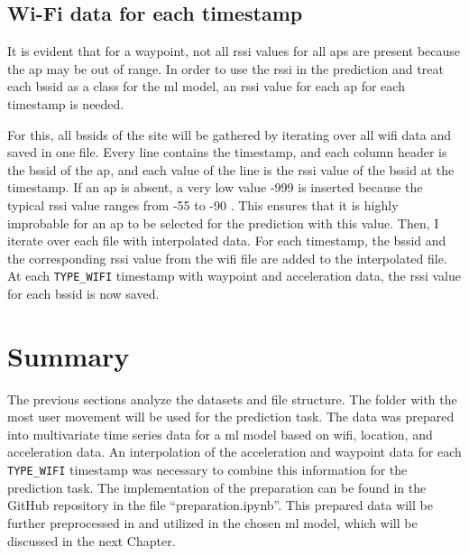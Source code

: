 \subsection{Wi-Fi data for each timestamp}\label{sec:wifi-data}
It is evident that for a waypoint, not all \ac{rssi} values for all \acp{ap} are present because the \ac{ap} may be out of range.
In order to use the \ac{rssi} in the prediction and treat each \ac{bssid} as a class for the \ac{ml} model, an \ac{rssi} value for each \ac{ap} for each timestamp is needed.

For this, all \acp{bssid} of the site will be gathered by iterating over all \ac{wifi} data and saved in one file.
Every line contains the timestamp, and each column header is the \ac{bssid} of the \ac{ap}, and each value of the line is the \ac{rssi} value of the \ac{bssid} at the timestamp.
If an \ac{ap} is absent, a very low value -999 is inserted because the typical \ac{rssi} value ranges from -55 to -90 \cite{rssi_calculation}.
This ensures that it is highly improbable for an \ac{ap} to be selected for the prediction with this value.
Then, I iterate over each file with interpolated data. For each timestamp, the \ac{bssid} and the corresponding \ac{rssi} value from the \ac{wifi} file are added to the interpolated file.
At each \texttt{TYPE\_WIFI} timestamp with waypoint and acceleration data, the \ac{rssi} value for each \ac{bssid} is now saved.

\section{Summary}
The previous sections analyze the datasets and file structure.
The folder with the most user movement will be used for the prediction task.
The data was prepared into multivariate time series data for a \ac{ml} model based on \ac{wifi}, location, and acceleration data. 
An interpolation of the acceleration and waypoint data for each \texttt{TYPE\_WIFI} timestamp was necessary to combine this information for the prediction task.
The implementation of the preparation can be found in the GitHub repository \cite{github-repo} in the file ``preparation.ipynb''.
This prepared data will be further preprocessed in  and utilized in the chosen \ac{ml} model, which will be discussed in the next Chapter.
